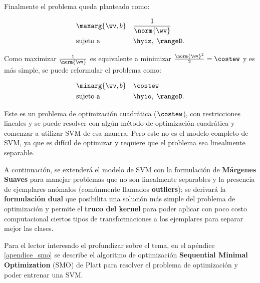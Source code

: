 
Finalmente el problema queda planteado como:


\begin{equation*}
\begin{aligned}
& \maxarg{\wv,b}
& &  \frac{1}{\norm{\wv}}\\
& \text{sujeto a}
& &  \hyiz, \; \rangeD.
\end{aligned}
\end{equation*}


Como maximizar $\frac{1}{\norm{\wv}}$ es equivalente a minimizar $\frac{\norm{\wv}^2}{2} = \costew$ y es más simple, se puede reformular el problema como:

\begin{equation*}
\begin{aligned}
& \minarg{\wv,b}
& &  \costew \\
& \text{sujeto a}
& &  \hyio, \; \rangeD.
\end{aligned}
\end{equation*}

Este es un problema de optimización cuadrática ($\costew$), con restricciones lineales y se puede resolver con algún método de optimización cuadrática y comenzar a utilizar SVM de esa manera. Pero este no es el modelo completo de SVM, ya que es difícil de optimizar y requiere que el problema sea linealmente separable.

A continuación, se extenderá el modelo de SVM con la formulación de \textbf{Márgenes Suaves} para manejar problemas que no son linealmente separables y la presencia de ejemplares anómalos (comúnmente llamados \textbf{outliers}); se derivará la \textbf{formulación dual} que posibilita una solución más simple del problema de optimización y permite el \textbf{truco del kernel} para poder aplicar con poco costo computacional ciertos tipos de transformaciones a los ejemplares para separar mejor las clases. 

Para el lector interesado el profundizar sobre el tema, en el apéndice \ref{apendice_smo} se describe el algoritmo de optimización \textbf{Sequential Minimal Optimization} (SMO) de Platt \cite{platt1998} para resolver el problema de optimización y poder entrenar una SVM.
 